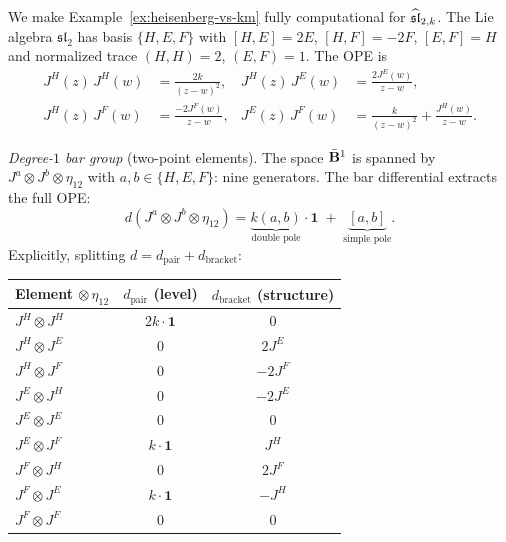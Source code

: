 \begin{example}
\label{ex:sl2-bar-matrix}

We make Example~\ref{ex:heisenberg-vs-km} fully computational for
$\widehat{\mathfrak{sl}}_{2,k}$.  The Lie algebra $\mathfrak{sl}_2$ has basis
$\{H, E, F\}$ with $[H, E] = 2E$, $[H, F] = -2F$, $[E, F] = H$
and normalized trace $(H, H) = 2$, $(E, F) = 1$.  The OPE is
\begin{align*}
J^H(z)\, J^H(w) &= \frac{2k}{(z-w)^2}, &
J^H(z)\, J^E(w) &= \frac{2J^E(w)}{z-w}, \\
J^H(z)\, J^F(w) &= \frac{-2J^F(w)}{z-w}, &
J^E(z)\, J^F(w) &= \frac{k}{(z-w)^2} + \frac{J^H(w)}{z-w}.
\end{align*}

\emph{Degree-$1$ bar group} (two-point elements).
The space $\bar{\mathbf{B}}^1$ is spanned by
$J^a \otimes J^b \otimes \eta_{12}$ with
$a, b \in \{H, E, F\}$: nine generators.  The bar differential
extracts the full OPE:
\[
d(J^a \otimes J^b \otimes \eta_{12})
= \underbrace{k(a,b)}_{\text{double pole}} \cdot \mathbf{1}
  \;+\; \underbrace{[a,b]}_{\text{simple pole}}.
\]
Explicitly, splitting $d = d_{\mathrm{pair}} + d_{\mathrm{bracket}}$:

\medskip
\begin{center}
\small
\renewcommand{\arraystretch}{1.2}
\begin{tabular}{@{}l@{\;\;\;}c@{\;\;\;}c@{}}
\hline
Element $\otimes\, \eta_{12}$ & $d_{\mathrm{pair}}$ (level)
  & $d_{\mathrm{bracket}}$ (structure) \\
\hline
$J^H \otimes J^H$ & $2k \cdot \mathbf{1}$ & $0$ \\
$J^H \otimes J^E$ & $0$ & $2J^E$ \\
$J^H \otimes J^F$ & $0$ & $-2J^F$ \\
$J^E \otimes J^H$ & $0$ & $-2J^E$ \\
$J^E \otimes J^E$ & $0$ & $0$ \\
$J^E \otimes J^F$ & $k \cdot \mathbf{1}$ & $J^H$ \\
$J^F \otimes J^H$ & $0$ & $2J^F$ \\
$J^F \otimes J^E$ & $k \cdot \mathbf{1}$ & $-J^H$ \\
$J^F \otimes J^F$ & $0$ & $0$ \\
\hline
\end{tabular}
\end{center}
\medskip


\end{example}
